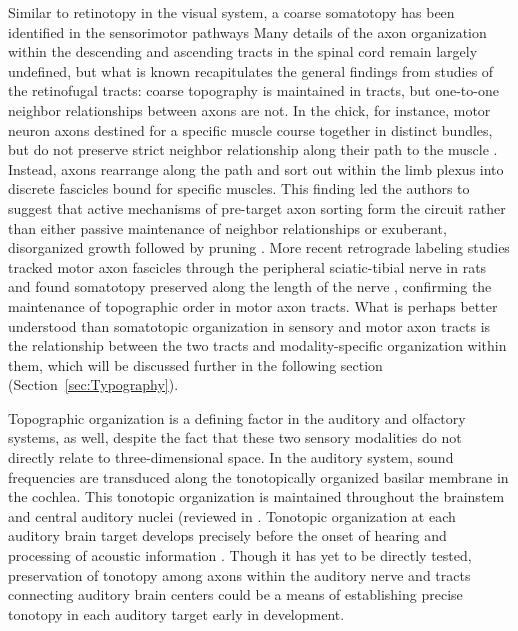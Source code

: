Similar to retinotopy in the visual system, a coarse somatotopy has been identified in the sensorimotor pathways \cite{barnard1956study,milner1998selective,maslany1991somatotopic}
Many details of the axon organization within the descending and ascending tracts in the spinal cord remain largely undefined, but what is known recapitulates the general findings from studies of the retinofugal tracts: coarse topography is maintained in tracts, but one-to-one neighbor relationships between axons are not.
In the chick, for instance, motor neuron axons destined for a specific muscle course together in distinct bundles, but do not preserve strict neighbor relationship along their path to the muscle \cite{lance1981pathway}. 
Instead, axons rearrange along the path and sort out within the limb plexus into discrete fascicles bound for specific muscles. 
This finding led the authors to suggest that active mechanisms of pre-target axon sorting form the circuit rather than either passive maintenance of neighbor relationships or exuberant, disorganized growth followed by pruning \cite{lance1981pathway}. %
More recent retrograde labeling studies tracked motor axon fascicles through the peripheral sciatic-tibial nerve in rats and found somatotopy preserved along the length of the nerve \cite{badia2010topographical}, confirming the maintenance of topographic order in motor axon tracts. 
What is perhaps better understood than somatotopic organization in sensory and motor axon tracts is the relationship between the two tracts and modality-specific organization within them, which will be discussed further in the following section (Section~\ref{sec:Typography}).

Topographic organization is a defining factor in the auditory and olfactory systems, as well, despite the fact that these two sensory modalities do not directly relate to three-dimensional space.
In the auditory system, sound frequencies are transduced along the tonotopically organized basilar membrane in the cochlea.
This tonotopic organization is maintained throughout the brainstem and central auditory nuclei (reviewed in \cite{appler2011connecting}.
Tonotopic organization at each auditory brain target develops precisely before the onset of hearing and processing of acoustic information \cite{appler2011connecting,rubel2002auditory}. 
Though it has yet to be directly tested, preservation of tonotopy among axons within the auditory nerve and tracts connecting auditory brain centers could be a means of establishing precise tonotopy in each auditory target early in development.

